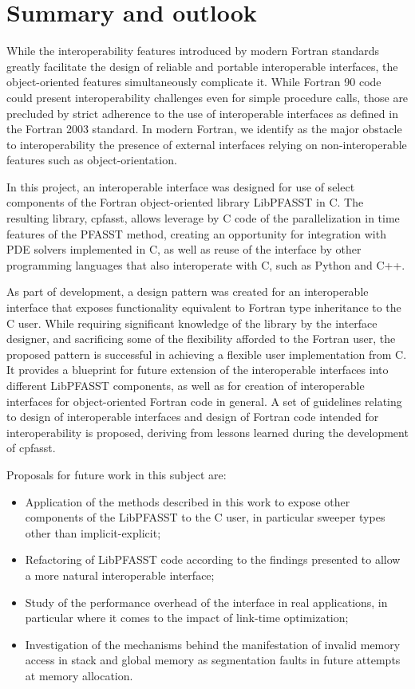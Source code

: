 \chapter{Summary and outlook}
\label{chapter:conclusion}

While the interoperability features introduced by modern Fortran standards greatly facilitate the design of reliable and portable interoperable interfaces, the object-oriented features simultaneously complicate it. While Fortran 90 code could present interoperability challenges even for simple procedure calls, those are precluded by strict adherence to the use of interoperable interfaces as defined in the Fortran 2003 standard. In modern Fortran, we identify as the major obstacle to interoperability the presence of external interfaces relying on non-interoperable features such as object-orientation.

In this project, an interoperable interface was designed for use of select components of the Fortran object-oriented library LibPFASST in C. The resulting library, cpfasst, allows leverage by C code of the parallelization in time features of the PFASST method, creating an opportunity for integration with PDE solvers implemented in C, as well as reuse of the interface by other programming languages that also interoperate with C, such as Python and C++.

As part of development, a design pattern was created for an interoperable interface that exposes functionality equivalent to Fortran type inheritance to the C user. While requiring significant knowledge of the library by the interface designer, and sacrificing some of the flexibility afforded to the Fortran user, the proposed pattern is successful in achieving a flexible user implementation from C. It provides a blueprint for future extension of the interoperable interfaces into different LibPFASST components, as well as for creation of interoperable interfaces for object-oriented Fortran code in general. A set of guidelines relating to design of interoperable interfaces and design of Fortran code intended for interoperability is proposed, deriving from lessons learned during the development of cpfasst.

Proposals for future work in this subject are:
\begin{itemize}
	\item Application of the methods described in this work to expose other components of the LibPFASST to the C user, in particular sweeper types other than implicit-explicit;
	\item Refactoring of LibPFASST code according to the findings presented to allow a more natural interoperable interface;
	\item Study of the performance overhead of the interface in real applications, in particular where it comes to the impact of link-time optimization;
	\item Investigation of the mechanisms behind the manifestation of invalid memory access in stack and global memory as segmentation faults in future attempts at memory allocation.
\end{itemize}